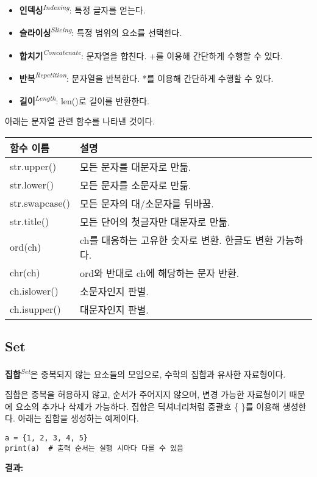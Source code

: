 \begin{itemize}
    \item \textbf{인덱싱}\textit{\textsuperscript{Indexing}}: 특정 글자를 얻는다.
    \item \textbf{슬라이싱}\textit{\textsuperscript{Slicing}}: 특정 범위의 요소를 선택한다.
    \item \textbf{합치기}\textit{\textsuperscript{Concatenate}}: 문자열을 합친다. +를 이용해 간단하게 수행할 수 있다.
    \item \textbf{반복}\textit{\textsuperscript{Repetition}}: 문자열을 반복한다. *를 이용해 간단하게 수행할 수 있다.
    \item \textbf{길이}\textit{\textsuperscript{Length}}: len()로 길이를 반환한다.
\end{itemize}

아래는 문자열 관련 함수를 나타낸 것이다.

\begin{longtable}[]{@{}p{4cm} p{10cm}@{}}
    \toprule
    함수 이름 & 설명\\
    \midrule
    \endhead
    str.upper() & 모든 문자를 대문자로 만듦.\\
    str.lower() & 모든 문자를 소문자로 만듦.\\
    str.swapcase() & 모든 문자의 대/소문자를 뒤바꿈.\\
    str.title() & 모든 단어의 첫글자만 대문자로 만듦.\\
    ord(ch) & ch를 대응하는 고유한 숫자로 변환. 한글도 변환 가능하다.\\
    chr(ch) & ord와 반대로 ch에 해당하는 문자 반환.\\
    ch.islower() & 소문자인지 판별.\\
    ch.isupper() & 대문자인지 판별.\\
    \bottomrule
\end{longtable}

\subsection{Set}
\textbf{집합}\textit{\textsuperscript{Set}}은 중복되지 않는 요소들의 모임으로, 수학의 집합과 유사한 자료형이다.

집합은 중복을 허용하지 않고, 순서가 주어지지 않으며, 변경 가능한 자료형이기 때문에 요소의 추가나 삭제가 가능하다. 집합은 딕셔너리처럼 중괄호 \{ \}를 이용해 생성한다. 아래는 집합을 생성하는 예제이다.

\begin{minipage}{\textwidth}
\begin{tcolorbox}[colframe=black, colback=white]
\begin{verbatim}
a = {1, 2, 3, 4, 5}
print(a)  # 출력 순서는 실행 시마다 다를 수 있음
\end{verbatim}
\end{tcolorbox}
\textbf{결과: }
\end{minipage}

